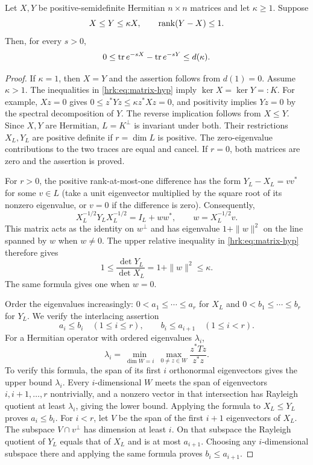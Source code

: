 \documentclass[11pt]{article}
\begin{document}
\begin{hrklemma}\label{hrk:lem:matrix}
Let $X,Y$ be positive-semidefinite Hermitian $n\times n$ matrices and
let $\kappa\geq1$. Suppose
\begin{equation}\label{hrk:eq:matrix-hyp}
 X\leq Y\leq\kappa X,\qquad \operatorname{rank}(Y-X)\leq1.
\end{equation}
Then, for every $s>0$,
\begin{equation}\label{hrk:eq:one-sided}
 0\leq\operatorname{tr} e^{-sX}-\operatorname{tr} e^{-sY}\leq d(\kappa).
\end{equation}
\end{hrklemma}
\begin{proof}
If $\kappa=1$, then $X=Y$ and the assertion follows from $d(1)=0$.
Assume $\kappa>1$. The inequalities in \eqref{hrk:eq:matrix-hyp} imply
$\ker X=\ker Y=:K$. For example, $Xz=0$ gives
$0\leq z^*Yz\leq\kappa z^*Xz=0$, and positivity implies $Yz=0$
by the spectral decomposition of $Y$. The reverse implication follows
from $X\leq Y$. Since $X,Y$ are Hermitian, $L=K^\perp$ is invariant
under both. Their restrictions $X_L,Y_L$ are positive definite if
$r=\dim L$ is positive. The zero-eigenvalue contributions to the two
traces are equal and cancel. If $r=0$, both matrices are zero and
the assertion is proved.

For $r>0$, the positive rank-at-most-one difference has the form
$Y_L-X_L=vv^*$ for some $v\in L$ (take a unit eigenvector multiplied
by the square root of its nonzero eigenvalue, or $v=0$ if the
difference is zero). Consequently,
\[
 X_L^{-1/2}Y_LX_L^{-1/2}=I_L+ww^*,\qquad
 w=X_L^{-1/2}v.
\]
This matrix acts as the identity on $w^\perp$ and has eigenvalue
$1+\|w\|^2$ on the line spanned by $w$ when $w\ne0$.
The upper relative inequality in \eqref{hrk:eq:matrix-hyp} therefore gives
\begin{equation}\label{hrk:eq:det-bound}
 1\leq\frac{\det Y_L}{\det X_L}
       =1+\|w\|^2\leq\kappa.
\end{equation}
The same formula gives one when $w=0$.

Order the eigenvalues increasingly:
$0<a_1\leq\cdots\leq a_r$ for $X_L$ and
$0<b_1\leq\cdots\leq b_r$ for $Y_L$.
We verify the interlacing assertion
\begin{equation}\label{hrk:eq:interlacing}
 a_i\leq b_i\quad(1\leq i\leq r),\qquad
 b_i\leq a_{i+1}\quad(1\leq i<r).
\end{equation}
For a Hermitian operator with ordered eigenvalues $\lambda_i$,
\[
 \lambda_i=\min_{\dim W=i}\ \max_{0\ne z\in W}
                   \frac{z^*Tz}{z^*z}.
\]
To verify this formula, the span of its first $i$ orthonormal
eigenvectors gives the upper bound $\lambda_i$. Every $i$-dimensional
$W$ meets the span of eigenvectors $i,i+1,\ldots,r$ nontrivially,
and a nonzero vector in that intersection has Rayleigh quotient at
least $\lambda_i$, giving the lower bound. Applying the formula to
$X_L\leq Y_L$ proves $a_i\leq b_i$. For $i<r$, let $V$ be the span
of the first $i+1$ eigenvectors of $X_L$. The subspace
$V\cap v^\perp$ has dimension at least $i$. On that subspace the
Rayleigh quotient of $Y_L$ equals that of $X_L$ and is at most
$a_{i+1}$. Choosing any $i$-dimensional subspace there and applying
the same formula proves $b_i\leq a_{i+1}$.


\end{proof}
\end{document}

